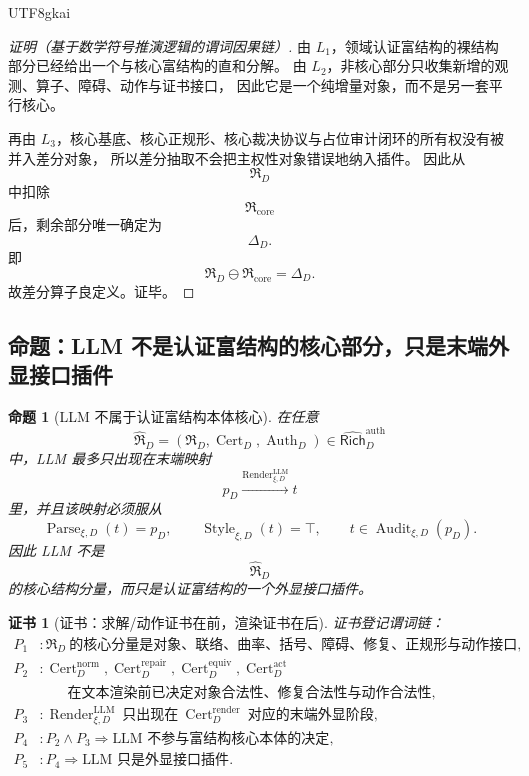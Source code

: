 \documentclass[12pt]{article}
\newtheorem{proposition}{命题}[section]
\newtheorem{Certificate}{证书}[section]
\newcommand{\Parse}{\operatorname{Parse}}
\newcommand{\Audit}{\operatorname{Audit}}
\newcommand{\Cert}{\operatorname{Cert}}
\newcommand{\Auth}{\operatorname{Auth}}
\newcommand{\Render}{\operatorname{Render}}
\newcommand{\Style}{\operatorname{Style}}
\begin{document}
\begin{CJK*}{UTF8}{gkai}
\begin{proof}[证明（基于数学符号推演逻辑的谓词因果链）]
由 $L_1$，领域认证富结构的裸结构部分已经给出一个与核心富结构的直和分解。
由 $L_2$，非核心部分只收集新增的观测、算子、障碍、动作与证书接口，
因此它是一个纯增量对象，而不是另一套平行核心。

再由 $L_3$，核心基底、核心正规形、核心裁决协议与占位审计闭环的所有权没有被并入差分对象，
所以差分抽取不会把主权性对象错误地纳入插件。
因此从
\[
  \mathfrak R_D
\]
中扣除
\[
  \mathfrak R_{\mathrm{core}}
\]
后，剩余部分唯一确定为
\[
  \Delta_D.
\]
即
\[
  \mathfrak R_D\ominus \mathfrak R_{\mathrm{core}}
  =
  \Delta_D.
\]
故差分算子良定义。证毕。
\end{proof}

\subsection{命题：LLM 不是认证富结构的核心部分，只是末端外显接口插件}
\label{subsec:tex37-ch8-proposition}

\begin{proposition}[LLM 不属于认证富结构本体核心]
\label{prop:tex37-ch8-llm-not-core}
在任意
\[
  \widehat{\mathfrak R}_D
  =
  (\mathfrak R_D,\Cert_D,\Auth_D)
  \in
  \widehat{\mathsf{Rich}}_D^{\mathrm{auth}}
\]
中，LLM 最多只出现在末端映射
\[
  p_D
  \xrightarrow{\Render^{\mathrm{LLM}}_{\xi,D}}
  t
\]
里，并且该映射必须服从
\[
  \Parse_{\xi,D}(t)=p_D,
  \qquad
  \Style_{\xi,D}(t)=\top,
  \qquad
  t\in \Audit_{\xi,D}(p_D).
\]
因此 LLM 不是
\[
  \widehat{\mathfrak R}_D
\]
的核心结构分量，而只是认证富结构的一个外显接口插件。
\end{proposition}

\begin{Certificate}[证书：求解/动作证书在前，渲染证书在后]
\label{cert:tex37-ch8-llm-not-core}
证书登记谓词链：
\[
\begin{aligned}
  P_1 &: \mathfrak R_D\ \text{的核心分量是对象、联络、曲率、括号、障碍、修复、正规形与动作接口},\\
  P_2 &: \Cert_D^{\mathrm{norm}},\Cert_D^{\mathrm{repair}},\Cert_D^{\mathrm{equiv}},\Cert_D^{\mathrm{act}}\\
  &\qquad \text{在文本渲染前已决定对象合法性、修复合法性与动作合法性},\\
  P_3 &: \Render^{\mathrm{LLM}}_{\xi,D}\ \text{只出现在}\ \Cert_D^{\mathrm{render}}\ \text{对应的末端外显阶段},\\
  P_4 &: P_2\wedge P_3\Rightarrow \text{LLM 不参与富结构核心本体的决定},\\
  P_5 &: P_4\Rightarrow \text{LLM 只是外显接口插件}.
\end{aligned}
\]
\end{Certificate}


\end{CJK*}
\end{document}
